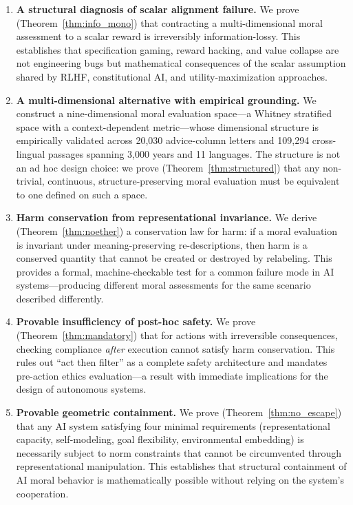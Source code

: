 \documentclass[12pt,letterpaper]{article}
\theoremstyle{definition}
\theoremstyle{remark}
\begin{document}
\begin{enumerate}
    \item \textbf{A structural diagnosis of scalar alignment failure.} We prove (Theorem~\ref{thm:info_mono}) that contracting a multi-dimensional moral assessment to a scalar reward is irreversibly information-lossy. This establishes that specification gaming, reward hacking, and value collapse are not engineering bugs but mathematical consequences of the scalar assumption shared by RLHF, constitutional AI, and utility-maximization approaches.

    \item \textbf{A multi-dimensional alternative with empirical grounding.} We construct a nine-dimensional moral evaluation space---a Whitney stratified space with a context-dependent metric---whose dimensional structure is empirically validated across 20,030 advice-column letters and 109,294 cross-lingual passages spanning 3,000 years and 11 languages. The structure is not an ad hoc design choice: we prove (Theorem~\ref{thm:structured}) that any non-trivial, continuous, structure-preserving moral evaluation must be equivalent to one defined on such a space.

    \item \textbf{Harm conservation from representational invariance.} We derive (Theorem~\ref{thm:noether}) a conservation law for harm: if a moral evaluation is invariant under meaning-preserving re-descriptions, then harm is a conserved quantity that cannot be created or destroyed by relabeling. This provides a formal, machine-checkable test for a common failure mode in AI systems---producing different moral assessments for the same scenario described differently.

    \item \textbf{Provable insufficiency of post-hoc safety.} We prove (Theorem~\ref{thm:mandatory}) that for actions with irreversible consequences, checking compliance \emph{after} execution cannot satisfy harm conservation. This rules out ``act then filter'' as a complete safety architecture and mandates pre-action ethics evaluation---a result with immediate implications for the design of autonomous systems.

    \item \textbf{Provable geometric containment.} We prove (Theorem~\ref{thm:no_escape}) that any AI system satisfying four minimal requirements (representational capacity, self-modeling, goal flexibility, environmental embedding) is necessarily subject to norm constraints that cannot be circumvented through representational manipulation. This establishes that structural containment of AI moral behavior is mathematically possible without relying on the system's cooperation.
\end{enumerate}
\end{document}
